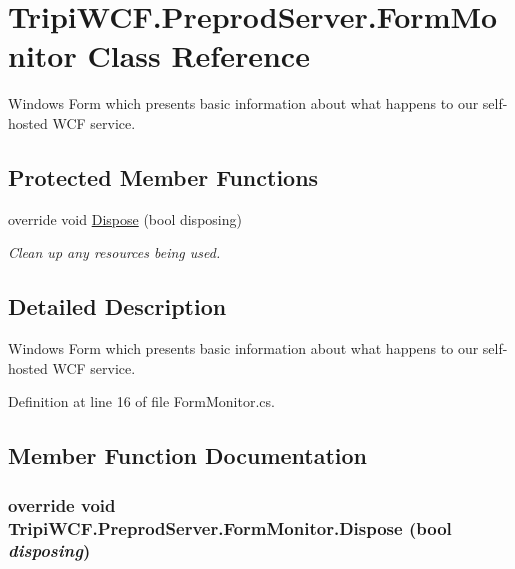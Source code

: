 \hypertarget{class_tripi_w_c_f_1_1_preprod_server_1_1_form_monitor}{
\section{TripiWCF.PreprodServer.FormMonitor Class Reference}
\label{class_tripi_w_c_f_1_1_preprod_server_1_1_form_monitor}
}


Windows Form which presents basic information about what happens to our self-\/hosted WCF service.  
\subsection*{Protected Member Functions}
\begin{DoxyCompactItemize}
\item 
override void \hyperlink{class_tripi_w_c_f_1_1_preprod_server_1_1_form_monitor_afb7cf1de026e3db34c391dbd18e3d3b1}{Dispose} (bool disposing)
\begin{DoxyCompactList}\small\item\em Clean up any resources being used. \item\end{DoxyCompactList}\end{DoxyCompactItemize}


\subsection{Detailed Description}
Windows Form which presents basic information about what happens to our self-\/hosted WCF service. 

Definition at line 16 of file FormMonitor.cs.

\subsection{Member Function Documentation}
\hypertarget{class_tripi_w_c_f_1_1_preprod_server_1_1_form_monitor_afb7cf1de026e3db34c391dbd18e3d3b1}{
\subsubsection[{Dispose}]{\setlength{\rightskip}{0pt plus 5cm}override void TripiWCF.PreprodServer.FormMonitor.Dispose (bool {\em disposing})}}
\label{class_tripi_w_c_f_1_1_preprod_server_1_1_form_monitor_afb7cf1de026e3db34c391dbd18e3d3b1}


